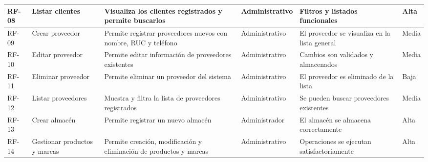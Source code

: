 \documentclass[12pt]{article} %
\begin{document}
  \begin{adjustbox}{width=\linewidth}
    \begin{tabularx}{\linewidth}{|>{\centering\arraybackslash}p{1cm}|
      >{\centering\arraybackslash}p{1.3cm}|
      >{\centering\arraybackslash}p{4.3cm}|
      >{\centering\arraybackslash}p{2.2cm}|
      >{\centering\arraybackslash}p{3.5cm}|
      >{\centering\arraybackslash}p{1.55cm}|}
\hline
      RF-08 & Listar clientes & Visualiza los clientes registrados y permite buscarlos & Administrativo & Filtros y listados funcionales & Alta \\
      \hline
      RF-09 & Crear proveedor & Permite registrar proveedores nuevos con nombre, RUC y teléfono & Administrativo & El proveedor se visualiza en la lista general & Media \\
      \hline
      RF-10 & Editar proveedor & Permite editar información de proveedores existentes & Administrativo & Cambios son validados y almacenados & Media \\
      \hline
      RF-11 & Eliminar proveedor & Permite eliminar un proveedor del sistema & Administrativo & El proveedor es eliminado de la lista & Baja \\
      \hline
      RF-12 & Listar proveedores & Muestra y filtra la lista de proveedores registrados & Administrativo & Se pueden buscar proveedores existentes & Media \\
      \hline
      RF-13 & Crear almacén & Permite registrar un nuevo almacén & Administrador & El almacén se almacena correctamente & Alta \\
      \hline
      RF-14 & Gestionar productos y marcas & Permite creación, modificación y eliminación de productos y marcas & Administrativo & Operaciones se ejecutan satisfactoriamente & Alta \\
      \hline
      
    \end{tabularx}
  \end{adjustbox}
  \normalsize

  \thispagestyle{plain}
  \footnotesize %
  \renewcommand{\arraystretch}{3} %
  
\end{document}
